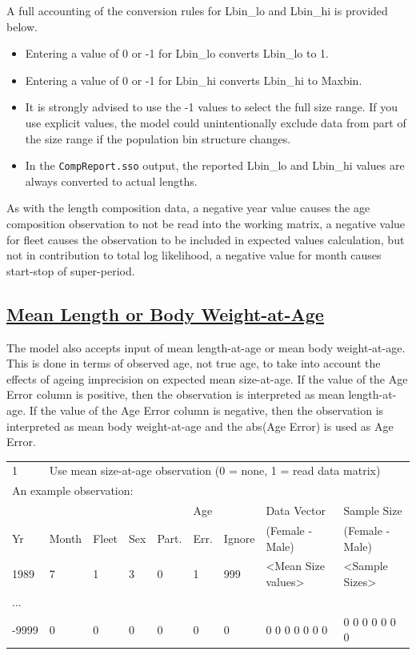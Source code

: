 A full accounting of the conversion rules for Lbin\_lo and Lbin\_hi is provided below.
\begin{itemize}
	\item Entering a value of 0 or -1 for Lbin\_lo converts Lbin\_lo to 1.
	\item Entering a value of 0 or -1 for Lbin\_hi converts Lbin\_hi to Maxbin.
	\item It is strongly advised to use the -1 values to select the full size range. If you use explicit values, the model could unintentionally exclude data from part of the size range if the population bin structure changes.
	\item In the \texttt{CompReport.sso} output, the reported Lbin\_lo and Lbin\_hi values are always converted to actual lengths.
\end{itemize}

As with the length composition data, a negative year value causes the age composition observation to not be read into the working matrix, a negative value for fleet causes the observation to be included in expected values calculation, but not in contribution to total log likelihood, a negative value for month causes start-stop of super-period.

\hypertarget{MeanLorBWatA}{}
\subsection[Mean Length or Body Weight-at-Age]{\protect\hyperlink{MeanLorBWatA}{Mean Length or Body Weight-at-Age}}
The model also accepts input of mean length-at-age or mean body weight-at-age. This is done in terms of observed age, not true age, to take into account the effects of ageing imprecision on expected mean size-at-age. If the value of the Age Error column is positive, then the observation is interpreted as mean length-at-age. If the value of the Age Error column is negative, then the observation is interpreted as mean body weight-at-age and the abs(Age Error) is used as Age Error.

\begin{center}
	\begin{tabular}{p{0.75cm} p{1cm} p{0.75cm} p{1cm} p{0.75cm} p{1cm} p{1cm} p{3.2cm} p{3.2cm}}
		\hline
		1 & \multicolumn{8}{l}{Use mean size-at-age observation (0 = none, 1 = read data matrix)} \Tstrut\\
		\multicolumn{9}{l}{An example observation:} \Bstrut\\
		\hline
		   &       &       &     &       & Age  &        & Data Vector     & Sample Size \Tstrut\\
		Yr & Month & Fleet & Sex & Part. & Err. & Ignore & (Female - Male) & (Female - Male) \Bstrut\\
		\hline
		1989  & 7 & 1 & 3 & 0 & 1 & 999 & <Mean Size values> & <Sample Sizes> \Tstrut\\
		...   &   &   &   &   &   &   &  & \\
		-9999 & 0 & 0 & 0 & 0 & 0 & 0 & 0 0 0 0 0 0 0 & 0 0 0 0 0 0 0 \Bstrut\\
		\hline
	\end{tabular}
\end{center}


